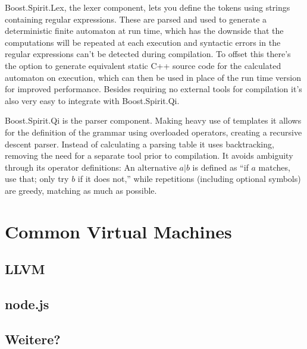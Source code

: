 			Boost.Spirit.Lex, the lexer component, lets you define the tokens using strings containing regular expressions. These are parsed and used to generate a deterministic finite automaton at run time, which has the downside that the computations will be repeated at each execution and syntactic errors in the regular expressions can't be detected during compilation. To offset this there's the option to generate equivalent static C++ source code for the calculated automaton on execution, which can then be used in place of the run time version for improved performance. Besides requiring no external tools for compilation it's also very easy to integrate with Boost.Spirit.Qi.
			
			Boost.Spirit.Qi is the parser component. Making heavy use of templates it allows for the definition of the grammar using overloaded operators, creating a recursive descent parser. Instead of calculating a parsing table it uses backtracking, removing the need for a separate tool prior to compilation. It avoids ambiguity through its operator definitions: An alternative $a|b$ is defined as ``if $a$ matches, use that; only try $b$ if it does not,'' while repetitions (including optional symbols) are greedy, matching as much as possible.

    \section{Common Virtual Machines}
        
        
        \subsection{LLVM}
        
        \subsection{node.js}
        
        
        \subsection{Weitere?}
        
